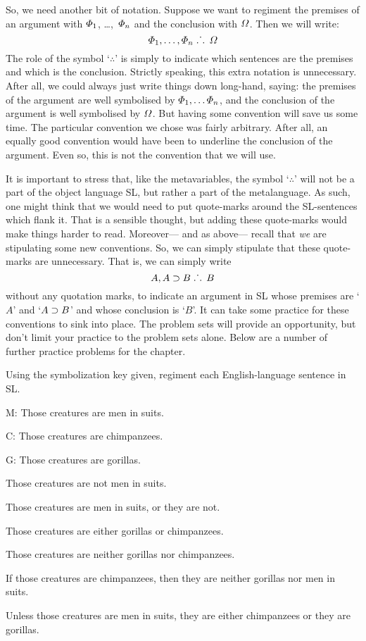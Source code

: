 So, we need another bit of notation. Suppose we want to regiment the premises of an argument with $\varPhi{}_1$, \dots,~$\varPhi{}_n$ and the conclusion with $\varOmega{}$. Then we will write:
$$\varPhi{}_1, \ldots, \varPhi{}_n \; \ldotp\dot{}\,\ldotp \; \varOmega{}$$
The role of the symbol `$\therefore$' is simply to indicate which sentences are the premises and which is the conclusion.
Strictly speaking, this extra notation is unnecessary.
After all, we could always just write things down long-hand, saying: the premises of the argument are well symbolised by $\varPhi{}_1, \ldots \varPhi{}_n$, and the conclusion of the argument is well symbolised by $\varOmega{}$.
But having some convention will save us some time.
The particular convention we chose was fairly arbitrary.
After all, an equally good convention would have been to underline the conclusion of the argument.
Even so, this is not the convention that we will use.

It is important to stress that, like the metavariables, the symbol `$\therefore$' will not be a part of the object language SL, but rather a part of the metalanguage.
As such, one might think that we would need to put quote-marks around the SL-sentences which flank it.
That is a sensible thought, but adding these quote-marks would make things harder to read.
Moreover--- and as above--- recall that \emph{we} are stipulating some new conventions.
So, we can simply stipulate that these quote-marks are unnecessary.
That is, we can simply write
$$A, A \supset B \; \ldotp\dot{}\,\ldotp \; B$$
without any quotation marks, to indicate an argument in SL whose premises are `$A$' and `$A \supset B$' and whose conclusion is `$B$'.
It can take some practice for these conventions to sink into place.
The problem sets will provide an opportunity, but don't limit your practice to the problem sets alone.
Below are a number of further practice problems for the chapter.




\practiceproblems

\solutions
\problempart Using the symbolization key given, regiment each English-language sentence in SL.
\label{pr.monkeysuits}
\begin{ekey}
\item[M:] Those creatures are men in suits. 
\item[C:] Those creatures are chimpanzees. 
\item[G:] Those creatures are gorillas.
\end{ekey}
\begin{earg}
\item Those creatures are not men in suits.
\item Those creatures are men in suits, or they are not.
\item Those creatures are either gorillas or chimpanzees.
\item Those creatures are neither gorillas nor chimpanzees.
\item If those creatures are chimpanzees, then they are neither gorillas nor men in suits.
\item Unless those creatures are men in suits, they are either chimpanzees or they are gorillas.
\end{earg}


